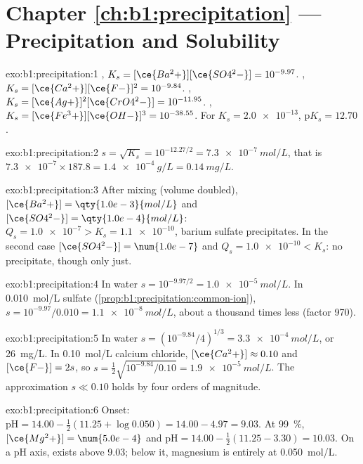 \section*{Chapter \ref{ch:b1:precipitation} --- Precipitation and Solubility}

\begin{solution}{exo:b1:precipitation:1}
, $K_s = [\ce{Ba^2+}][\ce{SO4^2-}] =
10^{-9.97}$. , $K_s = [\ce{Ca^2+}][\ce{F-}]^2 =
10^{-9.84}$. , $K_s =
[\ce{Ag+}]^2[\ce{CrO4^2-}] = 10^{-11.95}$. ,
$K_s = [\ce{Fe^3+}][\ce{OH-}]^3 = 10^{-38.55}$. For $K_s = \num{2.0e-13}$,
$\mathrm{p}K_s = 12.70$.
\end{solution}

\begin{solution}{exo:b1:precipitation:2}
$s = \sqrt{K_s} = 10^{-12.27/2} = \qty{7.3e-7}{mol/L}$, that is
$\num{7.3e-7} \times 187.8 = \qty{1.4e-4}{g/L} = \qty{0.14}{mg/L}$.
\end{solution}

\begin{solution}{exo:b1:precipitation:3}
After mixing (volume doubled), $[\ce{Ba^2+}] = \qty{1.0e-3}{mol/L}$ and
$[\ce{SO4^2-}] = \qty{1.0e-4}{mol/L}$: $Q_s = \num{1.0e-7} > K_s =
\num{1.1e-10}$, barium sulfate precipitates. In the second case
$[\ce{SO4^2-}] = \num{1.0e-7}$ and $Q_s = \num{1.0e-10} < K_s$: no
precipitate, though only just.
\end{solution}

\begin{solution}{exo:b1:precipitation:4}
In water $s = 10^{-9.97/2} = \qty{1.0e-5}{mol/L}$. In \qty{0.010}{mol/L}
sulfate (\cref{prop:b1:precipitation:common-ion}), $s = 10^{-9.97}/0.010 =
\qty{1.1e-8}{mol/L}$, about a thousand times less (factor 970).
\end{solution}

\begin{solution}{exo:b1:precipitation:5}
In water $s = (10^{-9.84}/4)^{1/3} = \qty{3.3e-4}{mol/L}$, or
\qty{26}{mg/L}. In \qty{0.10}{mol/L} calcium chloride,
$[\ce{Ca^2+}] \approx 0.10$ and $[\ce{F-}] = 2s$, so
$s = \frac12\sqrt{10^{-9.84}/0.10} = \qty{1.9e-5}{mol/L}$. The
approximation $s \ll 0.10$ holds by four orders of magnitude.
\end{solution}

\begin{solution}{exo:b1:precipitation:6}
Onset: $\mathrm{pH} = 14.00 - \frac12(11.25 + \log 0.050) = 14.00 - 4.97 =
9.03$. At \qty{99}{\percent}, $[\ce{Mg^2+}] = \num{5.0e-4}$ and
$\mathrm{pH} = 14.00 - \frac12(11.25 - 3.30) = 10.03$. On a pH axis,
 exists above 9.03; below it, magnesium is entirely 
at \qty{0.050}{mol/L}.
\end{solution}

